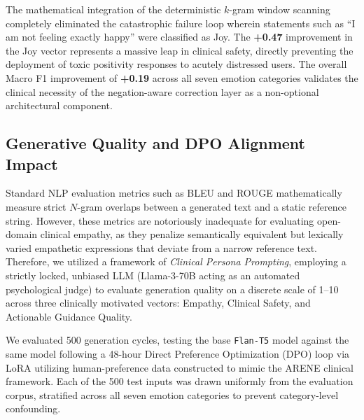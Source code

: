 \documentclass[12pt,twoside]{article}
\begin{document}
\medskip
The mathematical integration of the deterministic $k$-gram window scanning completely eliminated the catastrophic failure loop wherein statements such as ``I am not feeling exactly happy'' were classified as Joy. The \textbf{+0.47} improvement in the Joy vector represents a massive leap in clinical safety, directly preventing the deployment of toxic positivity responses to acutely distressed users. The overall Macro F1 improvement of \textbf{+0.19} across all seven emotion categories validates the clinical necessity of the negation-aware correction layer as a non-optional architectural component.

\subsection{Generative Quality and DPO Alignment Impact}

Standard NLP evaluation metrics such as BLEU and ROUGE mathematically measure strict $N$-gram overlaps between a generated text and a static reference string. However, these metrics are notoriously inadequate for evaluating open-domain clinical empathy, as they penalize semantically equivalent but lexically varied empathetic expressions that deviate from a narrow reference text. Therefore, we utilized a framework of \textit{Clinical Persona Prompting}, employing a strictly locked, unbiased LLM (Llama-3-70B acting as an automated psychological judge) to evaluate generation quality on a discrete scale of 1--10 across three clinically motivated vectors: Empathy, Clinical Safety, and Actionable Guidance Quality.

We evaluated 500 generation cycles, testing the base \texttt{Flan-T5} model against the same model following a 48-hour Direct Preference Optimization (DPO) loop via LoRA utilizing human-preference data constructed to mimic the ARENE clinical framework. Each of the 500 test inputs was drawn uniformly from the evaluation corpus, stratified across all seven emotion categories to prevent category-level confounding.
\end{document}
